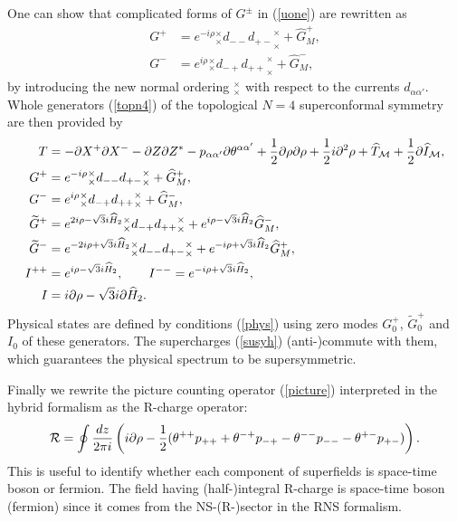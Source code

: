 \documentclass[a4paper,seceq,preprint]{ptptex}
\newcommand{\dz}{\frac{dz}{2\pi i}}
\newcommand{\norm}[1]{{}^\times_\times{#1}^\times_\times}
\begin{document}
One can show that complicated forms of $G^\pm$ in (\ref{uone}) are 
rewritten as
\begin{align}
  G^+&=e^{-i\rho}\norm{d_{--}d_{+-}}
+\widehat G^+_M,\nonumber\\
 G^-&=e^{i\rho}\norm{d_{-+}d_{++}}
+\widehat G^-_M,
\end{align}
by introducing the new normal ordering ${}^\times_\times$ 
with respect to the currents $d_{\alpha\alpha'}$.
Whole generators (\ref{topn4}) of the topological 
$N=4$ superconformal symmetry are then provided by
\begin{align}
  T&=-\partial X^+\partial X^-
-\partial Z\partial Z^*
-p_{\alpha\alpha'}\partial\theta^{\alpha\alpha'}
+\frac{1}{2}\partial\rho\partial\rho
+\frac{1}{2}i\partial^2\rho
+\widehat T_{\cal M}
+\frac{1}{2}\partial \widehat I_{\cal M},\nonumber\\
G^+&=e^{-i\rho}\norm{d_{--}d_{+-}}
+\widehat G^+_M,\nonumber\\
G^-&=e^{i\rho}\norm{d_{-+}d_{++}}
+\widehat G^-_M,\nonumber\\
\widetilde G^+&=
e^{2i\rho-\sqrt{3}i\widehat H_2}
\norm{d_{-+}d_{++}}
+e^{i\rho-\sqrt{3}i\widehat H_2}\widehat G^-_M,
\nonumber\\
\widetilde G^-&=
e^{-2i\rho+\sqrt{3}i\widehat H_2}
\norm{d_{--}d_{+-}}
+e^{-i\rho+\sqrt{3}i\widehat H_2}\widehat G^+_M,
\nonumber\\
I^{++}&=e^{i\rho-\sqrt{3}i\widehat H_2},\qquad
I^{--}=e^{-i\rho+\sqrt{3}i\widehat H_2},\nonumber\\
I&=i\partial\rho-\sqrt{3}i\partial\widehat H_2.\label{n4}
\end{align}
Physical states are defined by conditions (\ref{phys}) 
using zero modes $G_0^+$, $\widetilde G_0^+$ and $I_0$ of
these generators.
The supercharges (\ref{susyh}) (anti-)commute with them,
which guarantees the physical spectrum to be supersymmetric.

Finally we rewrite the picture counting operator 
(\ref{picture}) interpreted in the hybrid formalism 
as the R-charge operator:
\begin{equation}
 {\cal R}=\oint\dz\left(
i\partial\rho-\frac{1}{2}(
\theta^{++}p_{++}+\theta^{-+}p_{-+}-
\theta^{--}p_{--}-\theta^{+-}p_{+-})\right).\label{Rch}
\end{equation}
This is useful to identify whether each component of superfields
is space-time boson or fermion. The field having
(half-)integral R-charge is space-time boson (fermion) since
it comes from the NS-(R-)sector in the RNS formalism.
\end{document}
